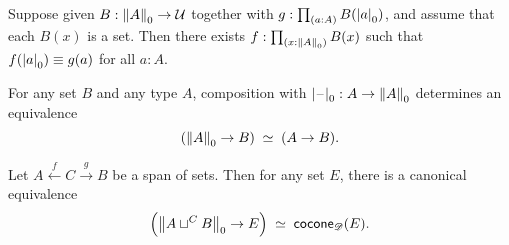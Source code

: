 \documentclass[hott-all.tex]{subfiles}
\begin{document}
% 
\begin{lem}
  Suppose given $B:\trunc0 A \to \type$ together with $g:\prd{a:A} B(\tproj0a)$, and assume that each $B(x)$ is a set.
  Then there exists $f:\prd{x:\trunc0A} B(x)$ such that $f(\tproj0a)\jdeq g(a)$ for all $a:A$.
\end{lem}
% 
% 
\begin{lem}
  For any set $B$ and any type $A$, composition with $\tprojf0:A\to \trunc0A$ determines an equivalence
  \[ \eqvspaced{(\trunc0A\to B)}{(A\to B)}. \]
\end{lem}
% 
% 
% 
\begin{lem}
  Let $A \xleftarrow{f} C \xrightarrow{g} B$ be a span of sets.
  Then for any set $E$, there is a canonical equivalence
  \[ \Parens{\trunc0{A\sqcup^C B} \to E} \;\eqvsym\; \cocone{\Ddiag}{E}. \]
\end{lem}
\end{document}
